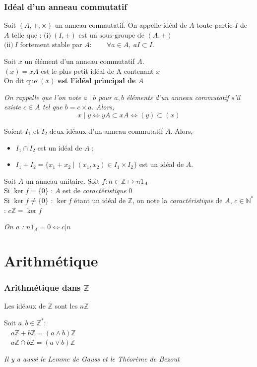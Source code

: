 \documentclass[a4paper,12pt]{report}
\newcommand{\Def}[2]{\begin{tcolorbox}[colback=white,colframe=CornflowerBlue, title=Définition : #1]#2\end{tcolorbox}}
\newcommand{\Thm}[2]{\begin{tcolorbox}[colback=white,colframe=Red!60, title=Théorème : #1]#2\end{tcolorbox}}
\def\N{\mathbb{N}}
\def\Z{\mathbb{Z}}
\newcommand{\ssi}{\Longleftrightarrow}
\begin{document}
\subsubsection{Idéal d'un anneau commutatif}
\Def{Idéal d'un anneau commutatif}{
Soit $(A,+,\times)$ un anneau commutatif. On appelle idéal de $A$ toute partie $I$ de $A$ telle que :
\(\text{(i)}\ (I,+)\text{ est un sous-groupe de }(A,+)\)\\
\(
\text{(ii)}\ I\text{ fortement stable par }A :
\qquad \forall a\in A,\ aI\subset I.
\)
}
\Def{Idéal principal}{
Soit $x$ un élément d’un anneau commutatif $A$. \\
$(x)=xA$ est le plus petit idéal de A contenant $x$\\
On dit que \textbf{$(x)$ est l'idéal principal de $A$}

\medskip

\textit{On rappelle que l’on note $a\mid b$ pour $a,b$ éléments d’un anneau commutatif s’il existe $c\in A$ tel que $b=c\times a$.
Alors,
\[
x\mid y \iff yA\subset xA \iff (y)\subset (x)
\]}
}

\Thm{Opération sur les idéaux}{
Soient $I_1$ et $I_2$ deux idéaux d’un anneau commutatif $A$. Alors,
\begin{itemize}
    \item $I_1\cap I_2$ est un idéal de $A$ ;
    \item $I_1+I_2=\{x_1+x_2 \mid (x_1,x_2)\in I_1\times I_2\}$ est un idéal de $A$.
\end{itemize}
}

\Def{Caractéristique d'un anneau (HP)}{
Soit $A$ un anneau unitaire. Soit $f : n\in\Z \longmapsto n1_A$\\
Si $\ker f = \{0\}$ : $A$ est de \textit{caractéristique} $0$\\
Si $\ker f \neq \{0\}$ : $\ker f$ étant un idéal de $\Z$, on note la \textit{caractéristique} de $A$, $c\in \N^*$: $c\Z = \ker f$

\textit{On a : $n1_A=0\ssi c|n$}
}

\section{Arithmétique}
\subsubsection{Arithmétique dans $\Z$}
\Thm{Les idéaux de $\Z$}{Les idéaux de $\Z$ sont les $n\Z$}
\Thm{Relation idéaux de $\Z$ et pgcd ppcm}{
Soit $a,b\in \Z^*$:\\
$\quad a\Z+b\Z = (a\land b)\Z$\\
$\quad a\Z\cap b\Z = (a\vee b)\Z$
}
\textit{Il y a aussi le Lemme de Gauss et le Théorème de Bezout}
\end{document}
